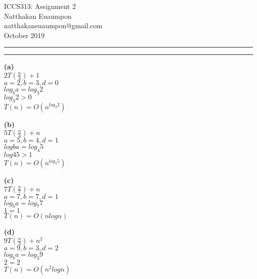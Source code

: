 \documentclass[a4paper, 11pt]{article}
\makeatletter
\newcommand{\question}[2] {\vspace{.25in} \hrule\vspace{0.5em}
\noindent{\bf #1: #2} \vspace{0.5em}
\hrule \vspace{.10in}}
\renewcommand{\part}[1] {\vspace{.10in} {\bf (#1)}}
\newcommand{\myname}{Natthakan Euaumpon}
\newcommand{\myemail}{natthakaneuaumpon@gmail.com}
\newcommand{\myhwnum}{2}
\makeatother
\begin{document}
\medskip                        %

\thispagestyle{plain}
\begin{center}                  %
{\Large ICCS313: Assignment \myhwnum} \\
\myname \\
\myemail \\
October 2019 \\
\end{center}

\question{1}{Part1}
\part{a}\\
$2T(\frac{n}{3})+1$\\
$a=2, b=3, d=0$\\
$log_{b}a = log_{3}2$\\
$log_{3}2 > 0$\\
$T(n)=O(n^{log_{3}2})$

\part{b}\\
$5T(\frac{n}{4})+n$\\
$a=5, b=4, d=1$\\
$log{b}a = log_{4}5$\\
$log{4}5 > 1$\\
$T(n)=O(n^{log_{4}5})$

\part{c}\\
$7T(\frac{n}{7})+n$\\
$a=7, b=7, d=1$\\
$log_{b}a = log_{7}7$\\
$1 = 1$\\
$T(n)=O(nlogn)$

\part{d}\\
$9T(\frac{n}{3})+n^{2}$\\
$a=9, b=3, d=2$\\
$log_{b}a = log_{3}9$\\
$2 = 2$\\
$T(n)=O(n^{2}logn)$
\end{document}
